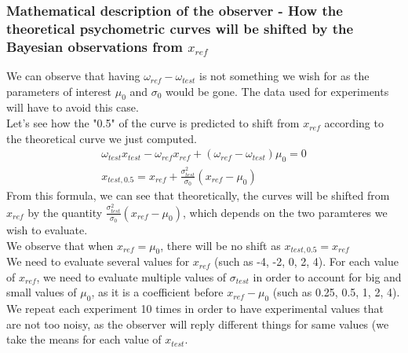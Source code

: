 \documentclass{article}
\begin{document}
\subsubsection*{Mathematical description of the observer - How the theoretical psychometric curves will be shifted by the Bayesian observations from $x_{ref}$}
We can observe that having $\omega_{ref}-\omega_{test}$ is not something we wish for as the parameters of interest $\mu_0$ and $\sigma_0$ would be gone. The data used for experiments will have to avoid this case.\\
Let's see how the "0.5" of the curve is predicted to shift from $x_{ref}$ according to the theoretical curve we just computed.
\begin{align*}
    \omega_{test}x_{test}-\omega_{ref}x_{ref}+(\omega_{ref}-\omega_{test})\mu_0 =0\\
    x_{test,0.5} = x_{ref} + \frac{\sigma_{test}^2}{\sigma_0}(x_{ref}-\mu_0)
\end{align*}
From this formula, we can see that theoretically, the curves will be shifted from $x_{ref}$ by the quantity $\frac{\sigma_{test}^2}{\sigma_0}(x_{ref}-\mu_0)$, which depends on the two paramteres we wish to evaluate. \\
We observe that when $x_{ref}=\mu_0$, there will be no shift as $x_{test,0.5} = x_{ref} $\\
We need to evaluate several values for $x_{ref}$ (such as {-4, -2, 0, 2, 4}). For each value of $x_{ref}$, we need to evaluate multiple values of $\sigma_{test}$ in order to account for big and small values of $\mu_0$, as it is a coefficient before $x_{ref}-\mu_0$ (such as {0.25, 0.5, 1, 2, 4}).\\
We repeat each experiment 10 times in order to have experimental values that are not too noisy, as the observer will reply different things for same values (we take the means for each value of $x_{test}$.\\
\end{document}
